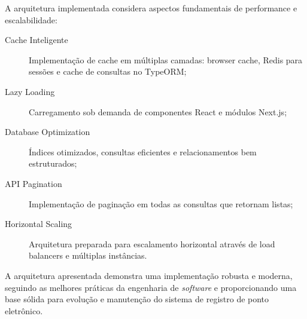 A arquitetura implementada considera aspectos fundamentais de performance e escalabilidade:

\begin{description}
    \item[Cache Inteligente] Implementação de cache em múltiplas camadas: browser cache, Redis para sessões e cache de consultas no TypeORM;
    \item[Lazy Loading] Carregamento sob demanda de componentes React e módulos Next.js;
    \item[Database Optimization] Índices otimizados, consultas eficientes e relacionamentos bem estruturados;
    \item[API Pagination] Implementação de paginação em todas as consultas que retornam listas;
    \item[Horizontal Scaling] Arquitetura preparada para escalamento horizontal através de load balancers e múltiplas instâncias.
\end{description}

A arquitetura apresentada demonstra uma implementação robusta e moderna, seguindo as melhores práticas da engenharia de \textit{software} e proporcionando uma base sólida para evolução e manutenção do sistema de registro de ponto eletrônico.